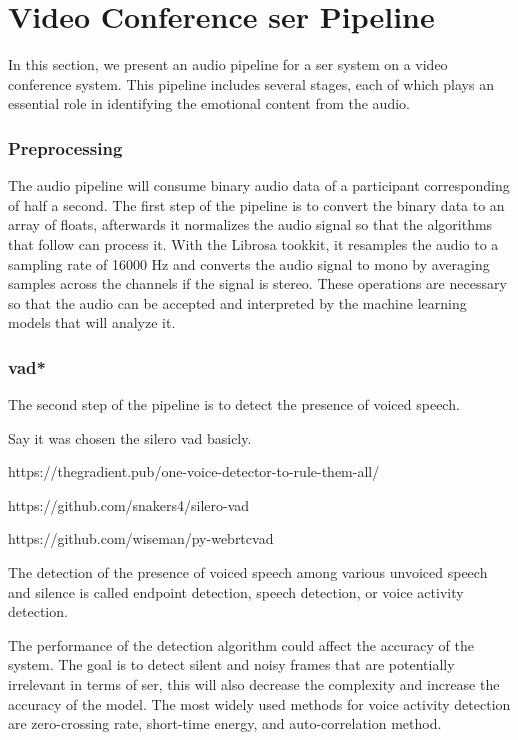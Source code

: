 \chapter{Video Conference \acl{ser} Pipeline}
\label{chapter:ser_conf}

In this section, we present an audio pipeline for a \ac{ser} system on a video conference system. This pipeline includes several stages, each of which plays an essential role in identifying the emotional content from the audio.

\subsection{Preprocessing}

The audio pipeline will consume binary audio data of a participant corresponding of half a second. The first step of the pipeline is to convert the binary data to an array of floats, afterwards it normalizes the audio signal so that the algorithms that follow can process it. With the Librosa tookkit, it  resamples the audio to a sampling rate of 16000 Hz and converts the audio signal to mono by averaging samples across the channels if the signal is stereo. These operations are necessary so that the audio can be accepted and interpreted by the machine learning models that will analyze it.

\subsection{\acl{vad*}}

The second step of the pipeline is to detect the presence of voiced speech.

Say it was chosen the silero vad basicly.

https://thegradient.pub/one-voice-detector-to-rule-them-all/

https://github.com/snakers4/silero-vad

https://github.com/wiseman/py-webrtcvad

The detection of the presence of voiced speech among various unvoiced speech and silence is called endpoint detection, speech detection, or voice activity detection.

The performance of the detection algorithm could affect the accuracy of the system. The goal is to detect silent and noisy frames that are potentially irrelevant in terms of \ac{ser}, this will also decrease the complexity and increase the accuracy of the model. The most widely used methods for voice activity detection are zero-crossing rate, short-time energy, and auto-correlation method.

